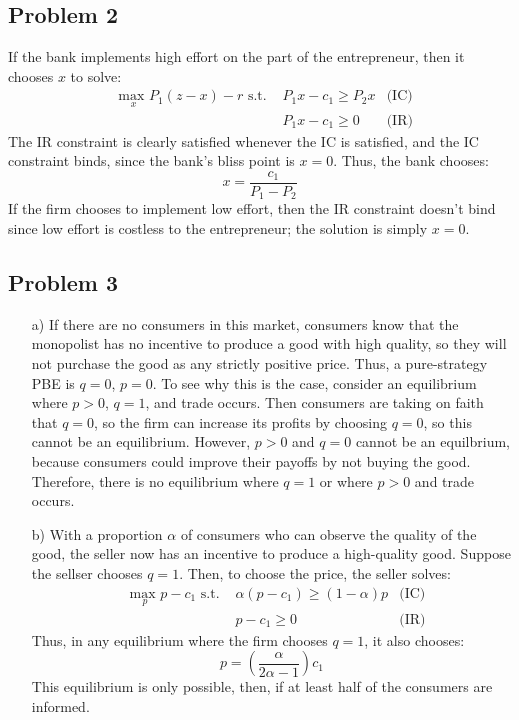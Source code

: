 \documentclass{article}
\newcommand{\usmax}[1]{\underset{#1}{\text{max }}}
\begin{document}

\subsection*{Problem 2}
If the bank implements high effort on the part of the entrepreneur, then it chooses $x$ to solve:
\begin{align*}
	&\usmax{x}P_1(z-x) - r\text{ s.t. }	&P_1x-c_1\geq P_2x	&\text{(IC)}	\\
	&									&P_1x-c_1\geq 0		&\text{(IR)}
\end{align*}
The IR constraint is clearly satisfied whenever the IC is satisfied, and the IC constraint binds, since the bank's bliss point is ${x=0}$. Thus, the bank chooses:
\[
	x = \frac{c_1}{P_1-P_2}
\]
If the firm chooses to implement low effort, then the IR constraint doesn't bind since low effort is costless to the entrepreneur; the solution is simply ${x=0}$. 


\subsection*{Problem 3}

\begin{itemize}
	\item[a)] If there are no consumers in this market, consumers know that the monopolist has no incentive to produce a good with high quality, so they will not purchase the good as any strictly positive price. Thus, a pure-strategy PBE is ${q=0}$, ${p=0}$. To see why this is the case, consider an equilibrium where ${p>0}$, ${q=1}$, and trade occurs. Then consumers are taking on faith that ${q=0}$, so the firm can increase its profits by choosing ${q=0}$, so this cannot be an equilibrium. However, ${p>0}$ and ${q=0}$ cannot be an equilbrium, because consumers could improve their payoffs by not buying the good. Therefore, there is no equilibrium where ${q=1}$ or where ${p>0}$ and trade occurs.
	
	\item[b)] With a proportion $\alpha$ of consumers who can observe the quality of the good, the seller now has an incentive to produce a high-quality good. Suppose the sellser chooses ${q=1}$. Then, to choose the price, the seller solves:
		\begin{align*}
			&\usmax{p}p-c_1\text{ s.t. }&\alpha\left(p-c_1\right) \geq (1-\alpha)p	&\text{(IC)}	\\
			&							&p-c_1\geq 0								&\text{(IR)}
		\end{align*}
		Thus, in any equilibrium where the firm chooses ${q=1}$, it also chooses:
		\[
			p = \left(\frac{\alpha}{2\alpha-1}\right)c_1
		\]
		This equilibrium is only possible, then, if at least half of the consumers are informed.
		
\end{itemize}

\end{document}
